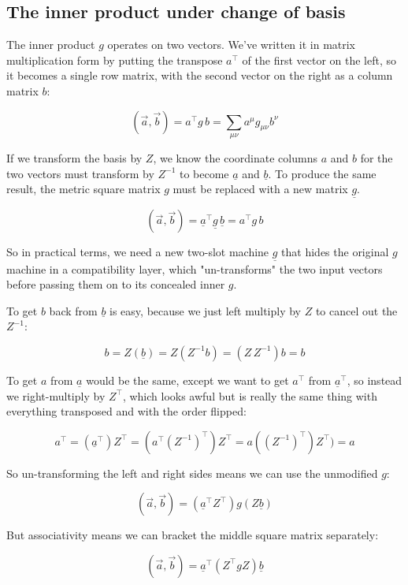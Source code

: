 \subsection{The inner product under change of basis}

The inner product $g$ operates on two vectors. We've written it in matrix multiplication form by putting the transpose $a^\intercal$ of the first vector on the left, so it becomes a single row matrix, with the second vector on the right as a column matrix $b$:

$$
(\vec{a}, \vec{b}) = a^\intercal g\, b = \sum_{\mu\nu} a^{\mu} g_{\mu\nu} b^{\nu}
$$

If we transform the basis by $Z$, we know the coordinate columns $a$ and $b$ for the two vectors must transform by $Z^{-1}$ to become $\underline{a}$ and $\underline{b}$. To produce the same result, the metric square matrix $g$ must be replaced with a new matrix $\underline{g}$. 

$$
(\vec{a}, \vec{b}) = \underline{a}^\intercal \underline{g}\, \underline{b} = a^\intercal g\, b
$$

So in practical terms, we need a new two-slot machine $\underline{g}$ that hides the original $g$ machine in a compatibility layer, which "un-transforms" the two input vectors before passing them on to its concealed inner $g$.

To get $b$ back from $\underline{b}$ is easy, because we just left multiply by $Z$ to cancel out the $Z^{-1}$:

$$
b = Z(\underline{b}) = Z(Z^{-1}b) = (Z\,Z^{-1})b = b
$$

To get $a$ from $\underline{a}$ would be the same, except we want to get $a^\intercal$ from $\underline{a}^\intercal$, so instead we right-multiply by $Z^\intercal$, which looks awful but is really the same thing with everything transposed and with the order flipped:

$$
a^\intercal = (\underline{a}^\intercal)Z^\intercal = (a^\intercal (Z^{-1})^\intercal) Z^\intercal = a((Z^{-1})^\intercal) Z^\intercal) = a
$$

So un-transforming the left and right sides means we can use the unmodified $g$:

$$
(\vec{a}, \vec{b}) = (\underline{a}^\intercal Z^\intercal) g (Z \underline{b}) 
$$

But associativity means we can bracket the middle square matrix separately:

$$
(\vec{a}, \vec{b}) = \underline{a}^\intercal (Z^\intercal g Z) \underline{b} 
$$

